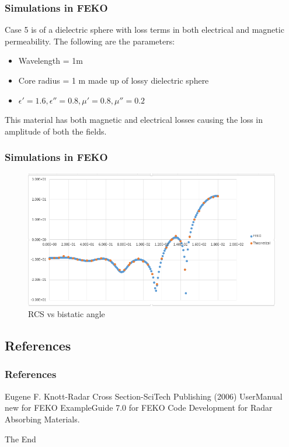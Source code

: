 \documentclass{beamer}
\begin{document}
\begin{frame}
\frametitle{Simulations in FEKO}
Case 5 is of a dielectric sphere with loss terms in both electrical and magnetic permeability. The following are the parameters:
\begin{itemize}
\item Wavelength = 1m
\item Core radius = 1 m made up of lossy dielectric sphere
\item $\epsilon' = 1.6, \epsilon'' =0.8, \mu' = 0.8, \mu''=0.2$
\end{itemize}
This material has both magnetic and electrical losses causing the loss in amplitude of both the fields.
\end{frame}
\begin{frame}
\frametitle{Simulations in FEKO}
\begin{figure}[H]
\centering
\includegraphics[width = \textwidth]{case5.PNG}
\caption{RCS vs bistatic angle}
\end{figure}
\end{frame}

\begin{frame}
\section{References}
\frametitle{References}
\footnotesize{
\begin{thebibliography}{99} %
 Eugene F. Knott-Radar Cross Section-SciTech Publishing (2006)
 UserManual new for FEKO
 ExampleGuide 7.0 for FEKO
 Code Development for Radar Absorbing Materials.
\end{thebibliography}
}
\end{frame}


\begin{frame}
\Huge{\centerline{The End}}
\end{frame}

\end{document}
